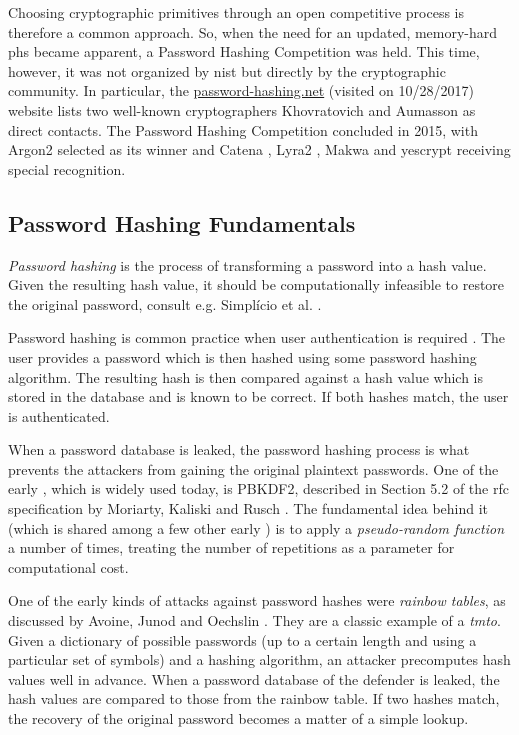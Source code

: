 Choosing cryptographic primitives through an open competitive process is therefore a common approach. So, when the need for an updated, memory-hard \gls{phs} became apparent, a Password Hashing Competition was held. This time, however, it was not organized by \gls{nist} but directly by the cryptographic community. In particular, the \url{password-hashing.net} (visited on 10/28/2017) website lists two well-known cryptographers Khovratovich and Aumasson as direct contacts. The Password Hashing Competition concluded in 2015, with Argon2 \cite{biryukov:2015:argon2} selected as its winner and Catena \cite{forler:2013:catena}, Lyra2 \cite{andrade:2016:lyra2}, Makwa \cite{pornin:2015:makwa} and yescrypt \cite{peslyak:2015:yescrypt} receiving special recognition.

\subsection{Password Hashing Fundamentals}
\label{sec:fundamentals}

\emph{Password hashing} is the process of transforming a password into a hash value. Given the resulting hash value, it should be computationally infeasible to restore the original password, consult e.g. Simpl{\'i}cio et al. \cite{marcos:2015:lyra2}.

Password hashing is common practice when user authentication is required \cite{marcos:2015:lyra2}. The user provides a password which is then hashed using some password hashing algorithm. The resulting hash is then compared against a hash value which is stored in the database and is known to be correct. If both hashes match, the user is authenticated.

When a password database is leaked, the password hashing process is what prevents the attackers from gaining the original plaintext passwords. One of the early , which is widely used today, is PBKDF2, described in Section 5.2 of the \gls{rfc} specification by Moriarty, Kaliski and Rusch \cite{moriarty:2017:pkcs}. The fundamental idea behind it (which is shared among a few other early ) is to apply a \emph{pseudo-random function} a number of times, treating the number of repetitions as a parameter for computational cost.

One of the early kinds of attacks against password hashes were \emph{rainbow tables}, as discussed by Avoine, Junod and Oechslin \cite{Avoine:2008:CIT:1380564.1380565}. They are a classic example of a \emph{\gls{tmto}}. Given a dictionary of possible passwords (up to a certain length and using a particular set of symbols) and a hashing algorithm, an attacker precomputes hash values well in advance. When a password database of the defender is leaked, the hash values are compared to those from the rainbow table. If two hashes match, the recovery of the original password becomes a matter of a simple lookup.

